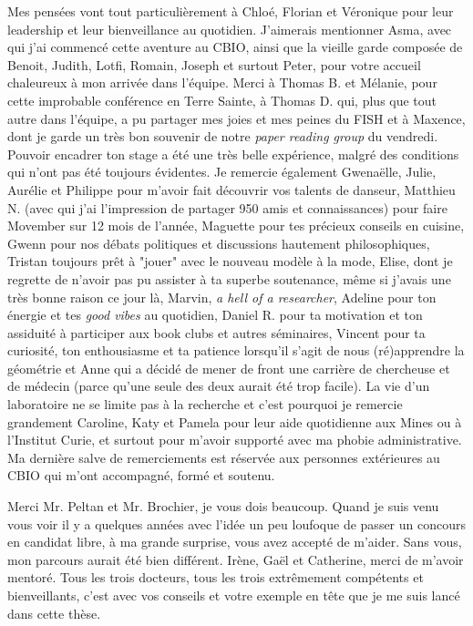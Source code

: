 Mes pensées vont tout particulièrement à Chloé, Florian et Véronique pour leur leadership et leur bienveillance au quotidien.
J'aimerais mentionner Asma, avec qui j'ai commencé cette aventure au CBIO, ainsi que la vieille garde composée de Benoit, Judith, Lotfi, Romain, Joseph et surtout Peter, pour votre accueil chaleureux à mon arrivée dans l'équipe.
Merci à Thomas B. et Mélanie, pour cette improbable conférence en Terre Sainte, à Thomas D. qui, plus que tout autre dans l'équipe, a pu partager mes joies et mes peines du FISH et à Maxence, dont je garde un très bon souvenir de notre \emph{paper reading group} du vendredi.
Pouvoir encadrer ton stage a été une très belle expérience, malgré des conditions qui n'ont pas été toujours évidentes.
Je remercie également Gwenaëlle, Julie, Aurélie et Philippe pour m'avoir fait découvrir vos talents de danseur, Matthieu N. (avec qui j'ai l'impression de partager 950 amis et connaissances) pour faire Movember sur 12 mois de l'année, Maguette pour tes précieux conseils en cuisine, Gwenn pour nos débats politiques et discussions hautement philosophiques, Tristan toujours prêt à "jouer" avec le nouveau modèle à la mode, Elise, dont je regrette de n'avoir pas pu assister à ta superbe soutenance, même si j'avais une très bonne raison ce jour là, Marvin, \emph{a hell of a researcher}, Adeline pour ton énergie et tes \emph{good vibes} au quotidien, Daniel R. pour ta motivation et ton assiduité à participer aux book clubs et autres séminaires, Vincent pour ta curiosité, ton enthousiasme et ta patience lorsqu'il s'agit de nous (ré)apprendre la géométrie et Anne qui a décidé de mener de front une carrière de chercheuse et de médecin (parce qu'une seule des deux aurait été trop facile).
La vie d'un laboratoire ne se limite pas à la recherche et c'est pourquoi je remercie grandement Caroline, Katy et Pamela pour leur aide quotidienne aux Mines ou à l'Institut Curie, et surtout pour m'avoir supporté avec ma phobie administrative.\\

Ma dernière salve de remerciements est réservée aux personnes extérieures au CBIO qui m'ont accompagné, formé et soutenu.

Merci Mr. Peltan et Mr. Brochier, je vous dois beaucoup.
Quand je suis venu vous voir il y a quelques années avec l'idée un peu loufoque de passer un concours en candidat libre, à ma grande surprise, vous avez accepté de m'aider.
Sans vous, mon parcours aurait été bien différent.
Irène, Gaël et Catherine, merci de m'avoir mentoré.
Tous les trois docteurs, tous les trois extrêmement compétents et bienveillants, c'est avec vos conseils et votre exemple en tête que je me suis lancé dans cette thèse.

